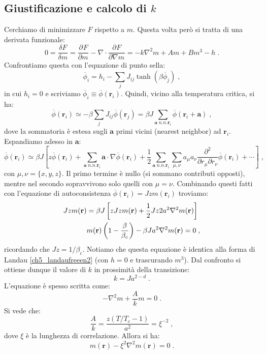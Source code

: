 \documentclass[10pt,a4paper]{report}
\theoremstyle{definition}
\newcommand{\pdev}[3][]{\frac{\partial^{#1} #2}{\partial #3^{#1}}}
\numberwithin{equation}{section}
\begin{document}
\subsection*{Giustificazione e calcolo di $k$}
Cerchiamo di minimizzare $F$ rispetto a $m$. Questa volta però si tratta di una derivata funzionale:
\begin{equation}
0=\frac{\delta F}{\delta m}=\pdev{F}{m}-\nabla\cdot\pdev{F}{\nabla m}=-k\nabla^2m+Am+Bm^3-h\;. \label{ch5_landaufreeen2}
\end{equation}
Confrontiamo questa con l'equazione di punto sella:
$$
\overline{\phi}_i=h_i-\sum_j J_{ij}\tanh(\beta\overline{\phi}_j)\;,
$$
in cui $h_i=0$ e scriviamo $\overline{\phi}_i\equiv \overline{\phi}(\mathbf{r}_i)$. Quindi, vicino alla temperatura critica, si ha:
$$
\overline{\phi}(\mathbf{r}_i)\simeq -\beta\sum_j J_{ij}\overline{\phi}(\mathbf{r}_j)=\beta J\sum_{\mathbf{a}\; n.n.\mathbf{r}_i}\overline{\phi}(\mathbf{r}_i+\mathbf{a})\;,
$$
dove la sommatoria è estesa sugli $\mathbf{a}$ primi vicini (nearest neighbor) ad $\mathbf{r}_i$. Espandiamo adesso in $\mathbf{a}$:
$$
\overline{\phi}(\mathbf{r}_i)\simeq \beta J\left[z\overline{\phi}(\mathbf{r}_i)+\sum_{\mathbf{a}\; n.n.\mathbf{r}_i}\mathbf{a}\cdot \nabla\overline{\phi}(\mathbf{r}_i)+\frac{1}{2}\sum_{\mathbf{a}\; n.n.\mathbf{r}_i}\sum_{\mu,\nu}a_{\mu}a_{\nu}\frac{\partial^2}{\partial r_{\mu}\partial r_{\nu}}\overline{\phi}(\mathbf{r}_i)+\cdots\right]\;,
$$
con $\mu,\nu=\{x,y,z\}$. Il primo termine è nullo (si sommano contributi opposti), mentre nel secondo sopravvivono solo quelli con $\mu=\nu$. Combinando questi fatti con l'equazione di autoconsistenza $\overline{\phi}(\mathbf{r}_i)=Jzm(\mathbf{r}_i)$ troviamo:
\begin{align}
Jzm(\mathbf{r}) &= \beta J\left[zJzm(\mathbf{r})+\frac{1}{2}Jz2a^2\nabla^2m(\mathbf{r})\right] \notag \\
&m(\mathbf{r})\left(1-\frac{\beta}{\beta_c}\right)-\beta Ja^2\nabla^2m(\mathbf{r})=0\;,
\end{align}
ricordando che $Jz=1/\beta_c$. Notiamo che questa equazione è identica alla forma di Landau \eqref{ch5_landaufreeen2}  (con $h=0$ e trascurando $m^3$). Dal confronto si ottiene dunque il valore di $k$ in prossimità della transizione:
\begin{equation}
k=Ja^{2-d}\;.
\end{equation}
L'equazione è spesso scritta come:
$$
-\nabla^2m+\frac{A}{k}m=0\;.
$$
Si vede che:
\begin{equation}
\frac{A}{k}=\frac{z(T/T_c-1)}{a^2}=\xi^{-2}\;,
\end{equation}
dove $\xi$ è la lunghezza di correlazione. Allora si ha:
\begin{equation}
m(\mathbf{r})-\xi^2\nabla^2m(\mathbf{r})=0\;.
\end{equation}
\end{document}
